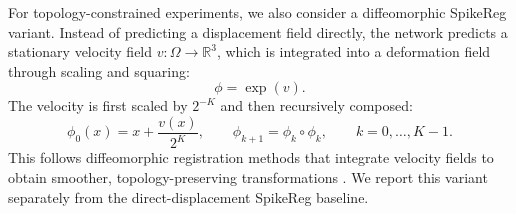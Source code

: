For topology-constrained experiments, we also consider a diffeomorphic SpikeReg variant. Instead of predicting a displacement field directly, the network predicts a stationary velocity field $v:\Omega \rightarrow \mathbb{R}^{3}$, which is integrated into a deformation field through scaling and squaring:
\begin{equation}
    \phi = \exp(v).
\end{equation}
The velocity is first scaled by $2^{-K}$ and then recursively composed:
\begin{equation}
    \phi_{0}(x) = x + \frac{v(x)}{2^{K}},
    \qquad
    \phi_{k+1} = \phi_{k} \circ \phi_{k},
    \qquad
    k=0,\ldots,K-1.
\end{equation}
This follows diffeomorphic registration methods that integrate velocity fields to obtain smoother, topology-preserving transformations \citep{dalca2018diffeomorphic,dalca2019probabilistic,chen2022transmorph}. We report this variant separately from the direct-displacement SpikeReg baseline.


